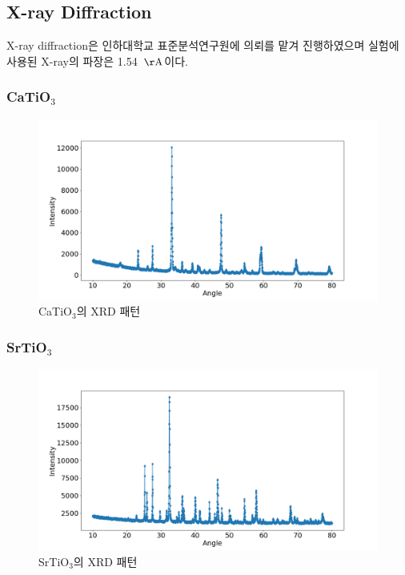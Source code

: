 \documentclass[aps,reprint,superscriptaddress,10pt]{revtex4-2}
\begin{document}
\subsection{X-ray Diffraction}
X-ray diffraction은 인하대학교 표준분석연구원에 의뢰를 맡겨 진행하였으며
실험에 사용된 X-ray의 파장은 1.54~$\mathrm{\AA}$이다.

\subsubsection{CaTiO$_3$}
\begin{figure}[htbp]
  \centering
  \includegraphics[scale=0.18]{Ca.png}
  \caption{CaTiO$_3$의 XRD 패턴}
  \label{fig:Ca}

\end{figure}



\subsubsection{SrTiO$_3$}
\begin{figure}[htbp]
  \centering
  \includegraphics[scale=0.18]{Sr.png}
  \caption{SrTiO$_3$의 XRD 패턴}
  \label{fig:Sr}

\end{figure}
\end{document}
